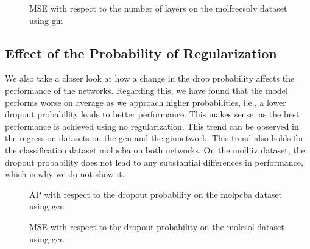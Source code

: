 \begin{figure}
    \centering
    \caption{MSE with respect to the number of layers on the molfreesolv dataset using \ac{gin}}
    \label{fig:layers-gin-molfreesolv}
\end{figure}


\subsection{Effect of the Probability of Regularization}

We also take a closer look at how a change in the drop probability affects the performance of the networks.
Regarding this, we have found that the model performs worse on average as we approach higher probabilities, i.e., a lower dropout probability leads to better performance.
This makes sense, as the best performance is achieved using no regularization.
This trend can be observed in the regression datasets on the \ac{gcn} and the \ac{gin}network. This trend also holds for the classification dataset molpcba on both networks. On the molhiv dataset, the dropout probability does not lead to any substantial differences in performance, which is why we do not show it.


\begin{figure}
    \centering
    \caption{AP with respect to the dropout probability on the molpcba dataset using \ac{gcn}}
    \label{fig:prob-gcn-molpcba}
\end{figure}

\begin{figure}
    \centering
    \caption{MSE with respect to the dropout probability on the molesol dataset using \ac{gcn}}
    \label{fig:prob-gcn-molesol}
\end{figure}

